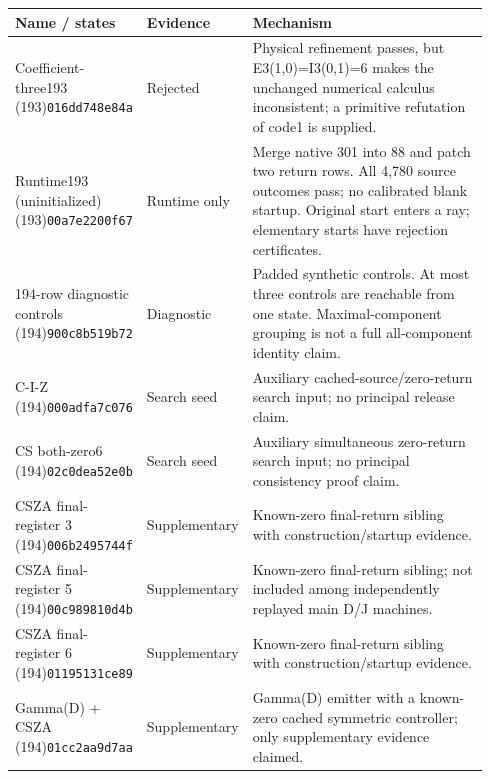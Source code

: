 \begin{longtable}{@{}p{0.24\linewidth}p{0.14\linewidth}p{0.56\linewidth}@{}}
\toprule Name / states & Evidence & Mechanism \\ \midrule\endhead
Coefficient-three193 (193)\newline\texttt{016dd748e84a} & Rejected & Physical refinement passes, but E3(1,0)=I3(0,1)=6 makes the unchanged numerical calculus inconsistent; a primitive refutation of code1 is supplied.\\[4pt]
Runtime193 (uninitialized) (193)\newline\texttt{00a7e2200f67} & Runtime only & Merge native 301 into 88 and patch two return rows. All 4,780 source outcomes pass; no calibrated blank startup. Original start enters a ray; elementary starts have rejection certificates.\\[4pt]
194-row diagnostic controls (194)\newline\texttt{900c8b519b72} & Diagnostic & Padded synthetic controls. At most three controls are reachable from one state. Maximal-component grouping is not a full all-component identity claim.\\[4pt]
C-I-Z (194)\newline\texttt{000adfa7c076} & Search seed & Auxiliary cached-source/zero-return search input; no principal release claim.\\[4pt]
CS both-zero6 (194)\newline\texttt{02c0dea52e0b} & Search seed & Auxiliary simultaneous zero-return search input; no principal consistency proof claim.\\[4pt]
CSZA final-register 3 (194)\newline\texttt{006b2495744f} & Supplementary & Known-zero final-return sibling with construction/startup evidence.\\[4pt]
CSZA final-register 5 (194)\newline\texttt{00c989810d4b} & Supplementary & Known-zero final-return sibling; not included among independently replayed main D/J machines.\\[4pt]
CSZA final-register 6 (194)\newline\texttt{01195131ce89} & Supplementary & Known-zero final-return sibling with construction/startup evidence.\\[4pt]
Gamma(D) + CSZA (194)\newline\texttt{01cc2aa9d7aa} & Supplementary & Gamma(D) emitter with a known-zero cached symmetric controller; only supplementary evidence claimed.\\[4pt]

\end{longtable}
